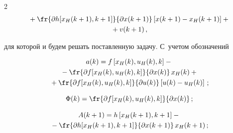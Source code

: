 \begin{multicols}{2}
\begin{multline}
  {}+


  \fr{\partial h[x_H(k+1),k+1]}{\partial x(k+1)}\left[ x(k+1)-


x_H(k+1)\right]+{}\\


{}+v(k+1)\,,\label{e5-c}


  \end{multline}


для которой и будем решать поставленную задачу. С~учетом обозначений


\begin{multline}


a(k)=f\left[ x_H(k),u_H(k),k\right] -{}\\


{}-\fr{\partial f [x_H(k),u_H(k),k]}{\partial


x(k)}\,x_H(k)+{}\\


{}+\fr{\partial f[x_H(k),u_H(k),k]}{\partial u(k)}\left [ u(k)-u_H(k)\right]\,;


\label{e6-c}


\end{multline}





\vspace*{-8pt}





\noindent


\begin{equation}


\Phi(k)=\fr{\partial f[x_H(k),u_H(k),k]}{\partial x(k)}\,;


\label{e7-c}


\end{equation}





\vspace*{-14pt}





\noindent


\begin{multline}


A(k+1)=h\left[ x_H(k+1),k+1\right]-{}\\


{}-\fr{\partial h [x_H(k+1),k+1]}{\partial


x(k+1)}\,x_H(k+1)\,;


\label{e8-c}



\end{multline}
\end{multicols}
